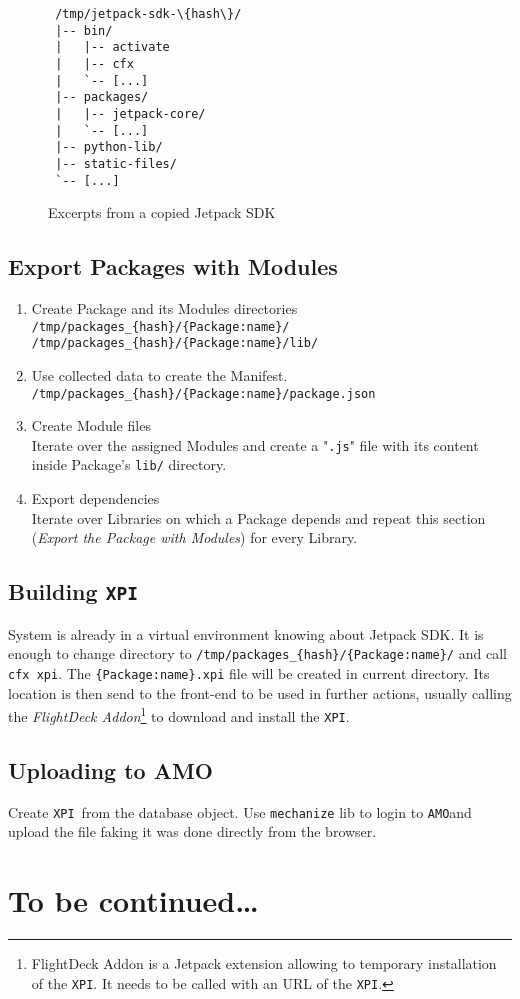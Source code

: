 \documentclass[10pt]{article}
\def\xpi{{\tt XPI}}
\def\amo{{\tt AMO}}
\begin{document}
			\begin{figure}[htp,capbesideposition={right,top},capbesideframe=yes]
				\begin{boxedminipage}{6cm}{\footnotesize\begin{lstlisting}		
 /tmp/jetpack-sdk-\{hash\}/
 |-- bin/
 |   |-- activate
 |   |-- cfx
 |   `-- [...]
 |-- packages/
 |   |-- jetpack-core/
 |   `-- [...]
 |-- python-lib/
 |-- static-files/
 `-- [...]
				\end{lstlisting}}\end{boxedminipage}
				\caption{Excerpts from a copied Jetpack SDK}
			\end{figure}
	
		
	
	\subsection{Export Packages with Modules}
		
		\begin{enumerate}
			\item{Create Package and its Modules directories\\
				{\tt /tmp/packages\_\{hash\}/\{Package:name\}/}\\
				{\tt /tmp/packages\_\{hash\}/\{Package:name\}/lib/}
			}
			\item{Use collected data to create the Manifest.\\
				{\tt /tmp/packages\_\{hash\}/\{Package:name\}/package.json}
			}
			\item{Create Module files\\
				Iterate over the assigned Modules and create a "{\tt .js}" file with its content inside 
				Package's {\tt lib/} directory.
			}
			\item{Export dependencies\\
				Iterate over Libraries on which a Package depends and repeat this section ({\em Export 
				the Package with Modules}) for every Library.
			}
		\end{enumerate}
	
	\subsection{Building \xpi}
	
		System is already in a virtual environment knowing about Jetpack SDK. It is enough to change 
		directory to {\tt /tmp/packages\_\{hash\}/\{Package:name\}/} and call {\tt cfx xpi}. The 
		{\tt \{Package:name\}.xpi} file will be created in current directory. Its location is then send
		to the front-end to be used in further actions, usually calling the {\em FlightDeck Addon}\footnote{
		FlightDeck Addon is a Jetpack extension allowing to temporary installation of the \xpi. It 
		needs to be called with an URL of the \xpi.} to download and install the \xpi.
	
	\subsection{Uploading to AMO}
	
		Create \xpi\ from the database object. Use {\tt mechanize} lib to login to \amo and upload the 
		file faking it was done directly from the browser.
							
\section*{To be continued\ldots}
\end{document}
